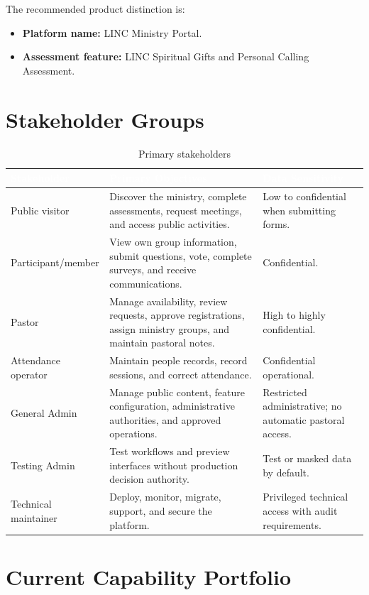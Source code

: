 \documentclass[11pt,a4paper,oneside]{report}
\begin{document}
The recommended product distinction is:

\begin{itemize}
  \item \textbf{Platform name:} LINC Ministry Portal.
  \item \textbf{Assessment feature:} LINC Spiritual Gifts and Personal Calling Assessment.
\end{itemize}

\section{Stakeholder Groups}

\begin{table}[H]
\centering
{}
\begin{tabularx}{\linewidth}{@{}l X X@{}}
\toprule
\rowcolor{primary}
\textcolor{white}{\textbf{Stakeholder}} & \textcolor{white}{\textbf{Primary Objectives}} & \textcolor{white}{\textbf{Data Sensitivity}} \\
\midrule
Public visitor & Discover the ministry, complete assessments, request meetings, and access public activities. & Low to confidential when submitting forms. \\
Participant/member & View own group information, submit questions, vote, complete surveys, and receive communications. & Confidential. \\
Pastor & Manage availability, review requests, approve registrations, assign ministry groups, and maintain pastoral notes. & High to highly confidential. \\
Attendance operator & Maintain people records, record sessions, and correct attendance. & Confidential operational. \\
General Admin & Manage public content, feature configuration, administrative authorities, and approved operations. & Restricted administrative; no automatic pastoral access. \\
Testing Admin & Test workflows and preview interfaces without production decision authority. & Test or masked data by default. \\
Technical maintainer & Deploy, monitor, migrate, support, and secure the platform. & Privileged technical access with audit requirements. \\
\bottomrule
\end{tabularx}
\caption{Primary stakeholders}
\end{table}

\section{Current Capability Portfolio}
\end{document}
